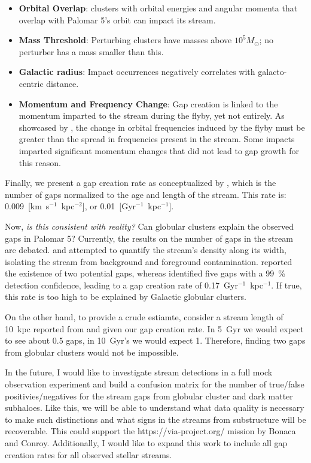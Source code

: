 \documentclass[draft]{aa}
\begin{document}
  \begin{itemize}
    \item \textbf{Orbital Overlap}: clusters with orbital energies and angular momenta that overlap with Palomar 5's orbit can impact its stream.
    \item \textbf{Mass Threshold}: Perturbing clusters have masses above $10^5 M_\odot$; no perturber has a mass smaller than this.
    \item \textbf{Galactic radius}: Impact occurrences negatively correlates with galacto-centric distance.
    \item \textbf{Momentum and Frequency Change}: Gap creation is linked to the momentum imparted to the stream during the flyby, yet not entirely. As showcased by \citet{2016MNRAS.457.3817S}, the change in orbital frequencies induced by the flyby must be greater than the spread in frequencies present in the stream. Some impacts imparted significant momentum changes that did not lead to gap growth for this reason.
  \end{itemize}

  Finally, we present a gap creation rate as conceptualized by \citet{2012ApJ...748...20C}, which is the number of gaps normalized to the age and length of the stream. This rate is: 0.009~[km~s$^{-1}$~kpc$^{-2}$], or 0.01~[Gyr$^{-1}$~kpc$^{-1}$].


  Now, \textit{is this consistent with reality?} Can globular clusters explain the observed gaps in Palomar 5? Currently, the results on the number of gaps in the stream are debated. \citet{2012ApJ...760...75C} and \citet{2020ApJ...889...70B} attempted to quantify the stream's density along its width, isolating the stream from background and foreground contamination. \citet{2020ApJ...889...70B} reported the existence of two potential gaps, whereas \citet{2012ApJ...760...75C} identified five gaps with a 99~\% detection confidence, leading to a gap creation rate of 0.17~Gyr$^{-1}$~kpc$^{-1}$. If true, this rate is too high to be explained by Galactic globular clusters.

  On the other hand, to provide a crude estiamte, consider  a stream length of 10~kpc reported from \citet{2020ApJ...889...70B} and given our gap creation rate. In 5~Gyr we would expect to see about 0.5 gaps, in 10~Gyr's we would expect 1. Therefore, finding two gaps from globular clusters would not be impossible.

  In the future, I would like to investigate stream detections in a full mock observation experiment and build a confusion matrix for the number of true/false positivies/negatives for the stream gaps from globular cluster and dark matter subhaloes. Like this, we will be able to understand what data quality is necessary to make such distinctions and what signs in the streams from substructure will be recoverable. This could support the https://via-project.org/ mission by Bonaca and Conroy. Additionally, I would like to expand this work to include all gap creation rates for all observed stellar streams. 
\end{document}
